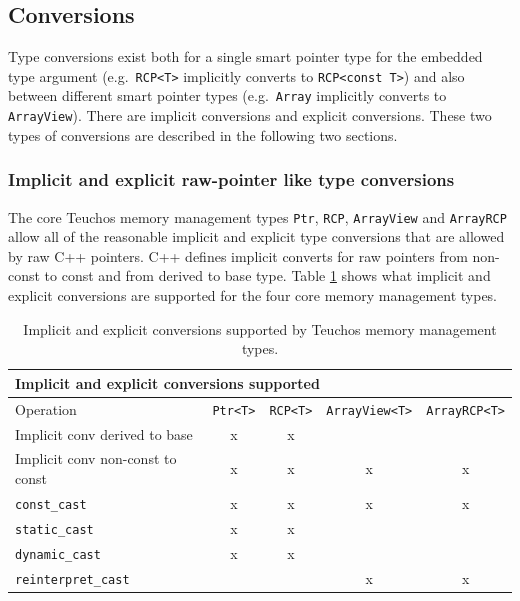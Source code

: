 \documentclass[pdf,ps2pdf,11pt]{SANDreport}
\begin{document}
%
{}\subsection{Conversions}
\label{sec:conversions}
%

Type conversions exist both for a single smart pointer type for the
embedded type argument (e.g.\ {}\texttt{RCP<T>} implicitly converts to
{}\texttt{RCP<const T>}) and also between different smart pointer
types (e.g.\ {}\texttt{Array} implicitly converts to
{}\texttt{ArrayView}).  There are implicit conversions and explicit
conversions.  These two types of conversions are described in the
following two sections.

%
{}\subsubsection{Implicit and explicit raw-pointer like type conversions}
\label{sec:raw-pointer-like-type-conversions}
%

The core Teuchos memory management types {}\texttt{Ptr},
{}\texttt{RCP}, {}\texttt{ArrayView} and {}\texttt{ArrayRCP} allow all
of the reasonable implicit and explicit type conversions that are
allowed by raw C++ pointers.  C++ defines implicit converts for raw
pointers from non-const to const and from derived to base type.  Table
{}\ref{tbl:implicit_explicit_conversions} shows what implicit and
explicit conversions are supported for the four core memory management
types.

\begin{table}
\begin{center}
\begin{tabular}{|l|c|c|c|c|}
\multicolumn{5}{l}{\textbf{Implicit and explicit conversions supported}} \\
\hline
Operation
& \texttt{Ptr<T>}
& \texttt{RCP<T>}
& \texttt{ArrayView<T>}
& \texttt{ArrayRCP<T>} \\
\hline
\hline
Implicit conv derived to base
& x
& x
& 
&  \\
\hline
Implicit conv non-const to const
& x
& x
& x
& x \\
\hline
{}\texttt{const\_cast}
& x
& x
& x
& x \\
\hline
{}\texttt{static\_cast}
& x
& x
& 
&  \\
\hline
{}\texttt{dynamic\_cast}
& x
& x 
& 
&  \\
\hline
{}\texttt{reinterpret\_cast}
& 
& 
& x
& x \\
\hline
\end{tabular}
\end{center}
\caption{\label{tbl:implicit_explicit_conversions}
Implicit and explicit conversions supported by Teuchos memory
management types.}
\end{table}
\end{document}
